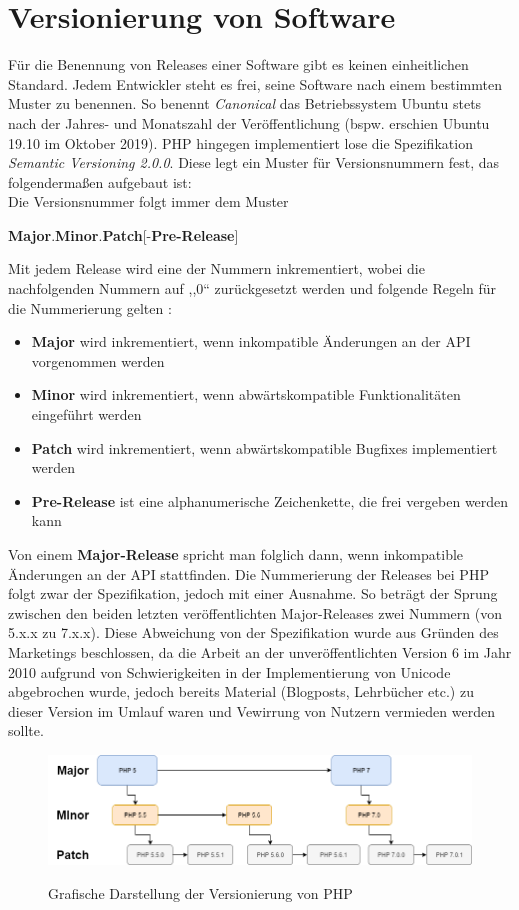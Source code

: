 \section{Versionierung von Software}
Für die Benennung von Releases einer Software gibt es keinen einheitlichen Standard. Jedem Entwickler steht es frei, seine
Software nach einem bestimmten Muster zu benennen. So benennt \textit{Canonical} das Betriebssystem Ubuntu stets nach der 
Jahres- und Monatszahl der Veröffentlichung (bspw. erschien Ubuntu 19.10 im Oktober 2019). \ac{PHP} hingegen implementiert
lose die Spezifikation \textit{Semantic Versioning 2.0.0}. Diese legt ein Muster für Versionsnummern fest, das 
folgendermaßen aufgebaut ist: \\
Die Versionsnummer folgt immer dem Muster \\ \centerline{\textbf{Major}.\textbf{Minor}.\textbf{Patch}{[-\textbf{Pre-Release}]}}
Mit jedem Release wird eine der Nummern inkrementiert, wobei die nachfolgenden Nummern auf ,,0`` zurückgesetzt werden 
und folgende Regeln für die Nummerierung gelten \cite{preston-werner_semantic_nodate}:
\begin{itemize}
    \item \textbf{Major} wird inkrementiert, wenn inkompatible Änderungen an der API vorgenommen werden
    \item \textbf{Minor} wird inkrementiert, wenn abwärtskompatible Funktionalitäten eingeführt werden
    \item \textbf{Patch} wird inkrementiert, wenn abwärtskompatible Bugfixes implementiert werden
    \item \textbf{Pre-Release} ist eine alphanumerische Zeichenkette, die frei vergeben werden kann
\end{itemize}
Von einem \textbf{Major-Release} spricht man folglich dann, wenn inkompatible Änderungen an der API stattfinden. 
Die Nummerierung der Releases bei \ac{PHP} folgt zwar der Spezifikation, jedoch mit einer Ausnahme. So beträgt der 
Sprung zwischen den beiden letzten veröffentlichten Major-Releases zwei Nummern (von 5.x.x zu 7.x.x). Diese Abweichung 
von der Spezifikation wurde aus Gründen des Marketings beschlossen, da die Arbeit an der unveröffentlichten Version 6 
im Jahr 2010 aufgrund von Schwierigkeiten in der Implementierung von Unicode abgebrochen wurde, jedoch bereits Material 
(Blogposts, Lehrbücher etc.) zu dieser Version im Umlauf waren und Vewirrung von Nutzern vermieden werden sollte.
\begin{figure}[bth]
    \myfloatalign
    {\includegraphics[width=1\linewidth]{gfx/semVer}} \quad
    \caption[Grafische Darstellung der Versionierung von \acs{PHP}]{Grafische Darstellung der Versionierung von \acs{PHP}}\label{fig:example}
\end{figure}
